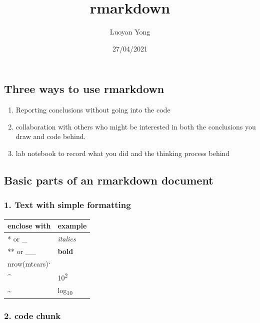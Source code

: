 \documentclass[
]{article}
\title{rmarkdown}
\author{Luoyan Yong}
\date{27/04/2021}
\providecommand{\tightlist}{%
  \setlength{\itemsep}{0pt}\setlength{\parskip}{0pt}}
\begin{document}
\maketitle

\hypertarget{three-ways-to-use-rmarkdown}{%
\subsection{Three ways to use
rmarkdown}\label{three-ways-to-use-rmarkdown}}

\begin{enumerate}
\def\labelenumi{\arabic{enumi}.}
\tightlist
\item
  Reporting conclusions without going into the code
\item
  collaboration with others who might be interested in both the
  conclusions you draw and code behind.
\item
  lab notebook to record what you did and the thinking process behind
\end{enumerate}

\hypertarget{basic-parts-of-an-rmarkdown-document}{%
\subsection{Basic parts of an rmarkdown
document}\label{basic-parts-of-an-rmarkdown-document}}

\hypertarget{text-with-simple-formatting}{%
\subsubsection{1. Text with simple
formatting}\label{text-with-simple-formatting}}

\begin{longtable}[]{@{}ll@{}}
\toprule
enclose with & example \\
\midrule
\endhead
* or \_ & \emph{italics} \\
** or \_\_ & \textbf{bold} \\
\texttt{\textbar{}}nrow(mtcars)` & \\
\^{} & 10\textsuperscript{2} \\
\textasciitilde{} & log\textsubscript{10} \\
\bottomrule
\end{longtable}

\hypertarget{code-chunk}{%
\subsubsection{2. code chunk}\label{code-chunk}}
\end{document}
